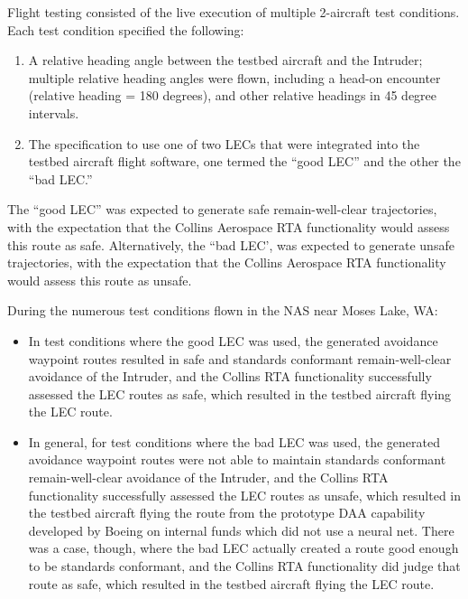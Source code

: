 Flight testing consisted of the live execution of multiple 2-aircraft test conditions.  Each test condition specified the following:
\begin{enumerate}
\item A relative heading angle between the testbed aircraft and the Intruder; multiple relative heading angles were flown, including a head-on encounter (relative heading = 180 degrees), and other relative headings in 45 degree intervals.
\item The specification to use one of two LECs that were integrated into the testbed aircraft flight software, one termed the ``good LEC'' and the other the ``bad LEC.''
\end{enumerate}

The ``good LEC'' was expected to generate safe remain-well-clear trajectories, with the expectation that the Collins Aerospace RTA functionality would assess this route as safe.  Alternatively, the “bad LEC’, was expected to generate unsafe trajectories, with the expectation that the Collins Aerospace RTA functionality would assess this route as unsafe.

During the numerous test conditions flown in the NAS near Moses Lake, WA:
\begin{itemize}
\item In test conditions where the good LEC was used, the generated avoidance waypoint routes resulted in safe and standards conformant remain-well-clear avoidance of the Intruder, and the Collins RTA functionality successfully assessed the LEC routes as safe, which resulted in the testbed aircraft flying the LEC route.
\item In general, for test conditions where the bad LEC was used, the generated avoidance waypoint routes were not able to maintain standards conformant remain-well-clear avoidance of the Intruder, and the Collins RTA functionality successfully assessed the LEC routes as unsafe, which resulted in the testbed aircraft flying the route from the prototype DAA capability developed by Boeing on internal funds which did not use a neural net.  There was a case, though, where the bad LEC actually created a route good enough to be standards conformant, and the Collins RTA functionality did judge that route as safe, which resulted in the testbed aircraft flying the LEC route.
\end{itemize}

